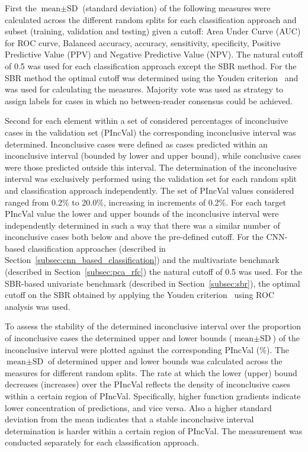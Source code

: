 First the $\text{mean} \pm \text{SD}$ (standard deviation) of the following measures were calculated across
the different random splits for each classification approach and subset (training, validation and testing) given a cutoff: 
Area Under Curve (AUC) for ROC curve, Balanced accuracy, accuracy, sensitivity, specificity, 
Positive Predictive Value (PPV) and Negative Predictive Value (NPV).
The natural cutoff of 0.5 was used for each classification approach except the SBR method.
For the SBR method the optimal cutoff was determined using the Youden criterion~\citep{Youden1950} and was used for
calculating the measures.
Majority vote was used as strategy to assign labels for cases in which no between-reader consensus could be achieved.

Second for each element within a set of considered percentages of inconclusive cases in the validation set (PIncVal)
the corresponding inconclusive interval was determined.
Inconclusive cases were defined as cases predicted within an inconclusive interval 
(bounded by lower and upper bound), while conclusive cases were those predicted outside this interval.
The determination of the inconclusive interval was exclusively performed using the validation set 
for each random split and classification approach independently.
The set of PIncVal values considered ranged from 0.2\% to 20.0\%, increasing in increments of 0.2\%.
For each target PIncVal value the lower and upper bounds of the inconclusive interval 
were independently determined in such a way that there was a similar number of inconclusive cases both below and above 
the pre-defined cutoff.
For the CNN-based classification approaches (described in Section~\ref{subsec:cnn_based_classification}) and the 
multivariate benchmark (described in Section~\ref{subsec:pca_rfc}) the natural cutoff of 0.5 was used.
For the SBR-based univariate benchmark (described in Section~\ref{subsec:sbr}), 
the optimal cutoff on the SBR obtained by applying the Youden criterion~\citep{Youden1950} using ROC analysis was used.

To assess the stability of the determined inconclusive interval over the proportion of inconclusive cases
the determined upper and lower bounds ($\text{mean} \pm \text{SD}$) of the inconclusive interval
were plotted against the corresponding PIncVal (\%).
The $\text{mean} \pm \text{SD}$ of determined upper and lower bounds was calculated across the measures for 
different random splits.
The rate at which the lower (upper) bound decreases (increases) over the PIncVal 
reflects the density of inconclusive cases within a certain region of PIncVal.
Specifically, higher function gradients indicate lower concentration of predictions, 
and vice versa.
Also a higher standard deviation from the mean indicates that a stable inconclusive interval determination 
is harder within a certain region of PIncVal.
The measurement was conducted separately for each classification approach.

